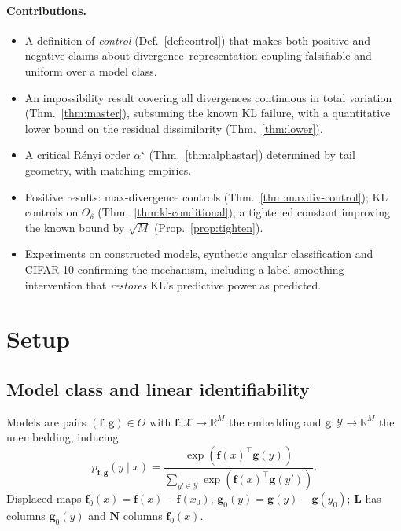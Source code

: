 \documentclass{article}
\newcommand{\X}{\mathcal{X}}
\newcommand{\Y}{\mathcal{Y}}
\newcommand{\bff}{\mathbf{f}}
\newcommand{\bfg}{\mathbf{g}}
\newcommand{\bfL}{\mathbf{L}}
\newcommand{\bfN}{\mathbf{N}}
\newcommand{\Thetadelta}{\Theta_{\delta}}
\theoremstyle{plain}
\theoremstyle{definition}
\theoremstyle{remark}
\begin{document}
\paragraph{Contributions.}
\begin{itemize}
  \item A definition of \emph{control} (Def.~\ref{def:control}) that makes both
        positive and negative claims about divergence--representation coupling
        falsifiable and uniform over a model class.
  \item An impossibility result covering all divergences continuous in total
        variation (Thm.~\ref{thm:master}), subsuming the known KL failure, with
        a quantitative lower bound on the residual dissimilarity
        (Thm.~\ref{thm:lower}).
  \item A critical R\'enyi order $\alpha^{\star}$ (Thm.~\ref{thm:alphastar})
        determined by tail geometry, with matching empirics.
  \item Positive results: max-divergence controls
        (Thm.~\ref{thm:maxdiv-control}); KL controls on $\Thetadelta$
        (Thm.~\ref{thm:kl-conditional}); a tightened constant improving the
        known bound by $\sqrt{M}$ (Prop.~\ref{prop:tighten}).
  \item Experiments on constructed models, synthetic angular classification and
        CIFAR-10 confirming the mechanism, including a label-smoothing
        intervention that \emph{restores} KL's predictive power as predicted.
\end{itemize}

\section{Setup}
\label{sec:setup}

\subsection{Model class and linear identifiability}
\label{sec:model-class}

Models are pairs $(\bff,\bfg)\in\Theta$ with $\bff:\X\to\mathbb{R}^{M}$ the
embedding and $\bfg:\Y\to\mathbb{R}^{M}$ the unembedding, inducing
\begin{equation}
  p_{\bff,\bfg}(y\mid x)
  = \frac{\exp(\bff(x)^{\top}\bfg(y))}
         {\sum_{y'\in\Y}\exp(\bff(x)^{\top}\bfg(y'))}.
  \label{eq:model}
\end{equation}
Displaced maps $\bff_{0}(x)=\bff(x)-\bff(x_{0})$,
$\bfg_{0}(y)=\bfg(y)-\bfg(y_{0})$; $\bfL$ has columns $\bfg_{0}(y)$ and $\bfN$
columns $\bff_{0}(x)$.
\end{document}
